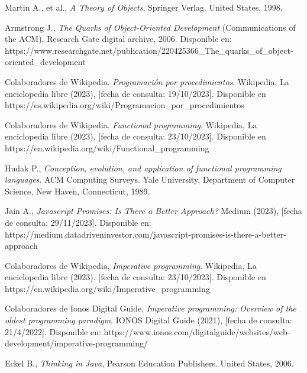 \begin{thebibliography}{11}
    \bibitem{}
    \label{sec:48}
    \hypertarget{48}{}
    Martin A., et al.,  \textit{A Theory of Objects}, Springer Verlag. United States, 1998.

    \bibitem{}
    \label{sec:49}
    \hypertarget{49}{}
    Armstrong J., \textit{The Quarks of Object-Oriented Development}  (Communications of the ACM), Research Gate digital archive, 2006. Disponible en: https://www.researchgate.net/publication/220425366\_The\_quarks\_of\_object-oriented\_development%

    \bibitem{}
    \label{sec:50}
    \hypertarget{50}{}
    Colaboradores de Wikipedia. \textit{Programación por procedimientos}, Wikipedia, La enciclopedia libre (2023), [fecha de consulta: 19/10/2023]. Disponible en https://es.wikipedia.org/wiki/Programacion\_por\_procedimientos

    \bibitem{}
    \label{sec:51}
    \hypertarget{51}{}
    Colaboradores de Wikipedia. \textit{Functional programming}. Wikipedia, La enciclopedia libre (2023), [fecha de consulta: 23/10/2023]. Disponible en https://en.wikipedia.org/wiki/Functional\_programming
    
    \bibitem{}
    \label{sec:52}
    \hypertarget{52}{}
    Hudak P., \textit{Conception, evolution, and application of functional programming languages}. ACM Computing Surveys. Yale University, Department of Computer Science, New Haven, Connecticut, 1989. %

    \bibitem{}
    \label{sec:53}
    \hypertarget{53}{}
    Jain A.,  \textit{Javascript Promises: Is There a Better Approach?} Medium (2023), [fecha de consulta: 29/11/2023]. Disponible en: https://medium.datadriveninvestor.com/javascript-promises-is-there-a-better-approach

    \bibitem{}
    \label{sec:54}
    \hypertarget{54}{}
    Colaboradores de Wikipedia, \textit{Imperative programming}. Wikipedia, La enciclopedia libre (2023). [fecha de consulta: 23/10/2023]. Disponible en https://en.wikipedia.org/wiki/Imperative\_programming

    \bibitem{}
    \label{sec:55}
    \hypertarget{55}{}
    Colaboradores de Ionos Digital Guide, \textit{Imperative programming: Overview of the oldest programming paradigm}. IONOS Digital Guide (2021), [fecha de consulta: 21/4/2022]. Disponible en: https://www.ionos.com/digitalguide/websites/web-development/imperative-programming/

    \bibitem{}
    \label{sec:56}
    \hypertarget{56}{}
    Eckel B.,  \textit{Thinking in Java}, Pearson Education Publishers. United States, 2006. %


\end{thebibliography}
